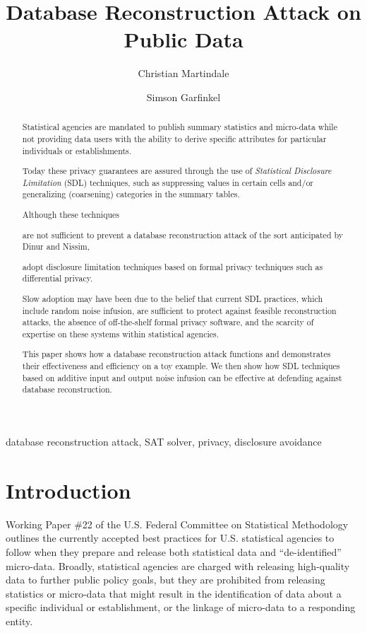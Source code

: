 \documentclass[runningheads]{llncs}
\newif\ifanonymized
\newif\ifshortversion
\begin{document}
\title{Database Reconstruction Attack on Public Data}
\ifanonymized
\author{Anonymized Author(s)}
\institute{Institute for Anonymous Papers}
\else
\author{Christian Martindale \and Simson Garfinkel}
\fi

\maketitle
\begin{abstract}
Statistical agencies are mandated to publish summary statistics and
micro-data while not providing data users with the ability to derive
specific attributes for particular individuals or
establishments. 
\ifshortversion
\else
Today these privacy guarantees are assured through the
use of \emph{Statistical Disclosure Limitation} (SDL)
techniques, such as suppressing values in certain cells 
and/or generalizing (coarsening) categories in
the summary tables. 
\fi
\ifshortversion
Traditional statistical disclosure limitation (SDL) techniques
\else
Although these techniques 
\fi
are not sufficient to
prevent a database reconstruction attack of the sort anticipated by
Dinur and Nissim\cite{noise}, 
\ifshortversion
and
\else
\fi
adopt disclosure limitation techniques based on formal privacy
techniques such as differential privacy. 
\ifshortversion
\else
Slow adoption may have been due to 
the belief that current SDL practices, which include random noise infusion,
are sufficient to protect against feasible reconstruction attacks, the absence
of off-the-shelf formal privacy software, and the scarcity of expertise on
these systems within statistical agencies. 
\fi
This paper shows how a database
reconstruction attack functions and demonstrates their effectiveness
and efficiency on a toy example. We then show how SDL techniques based
on additive input and output noise infusion can be effective at defending 
against database reconstruction.
\end{abstract}

\begin{keywords}
database reconstruction attack, SAT solver, 
\ifshortversion\else privacy,\fi 
disclosure avoidance
\end{keywords}


\section{Introduction}
Working Paper \#22 of the U.S. Federal Committee on Statistical
Methodology\cite{workingpaper22} outlines the currently accepted best
practices for U.S. statistical agencies to follow when they prepare and
release both statistical data and ``de-identified''
micro-data. Broadly, statistical agencies are charged with releasing
high-quality data to further public policy goals, but they are
prohibited from releasing statistics or micro-data that might result in the
identification of data about a specific individual or establishment, or the linkage
of micro-data to a responding entity.
\end{document}
